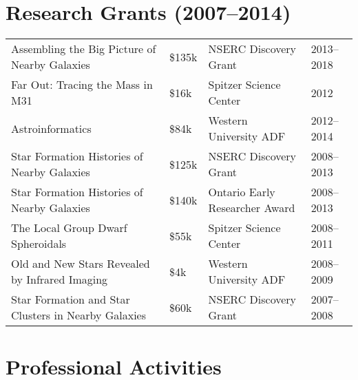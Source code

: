\documentclass[12pt]{article}
\begin{document}

\section{Research Grants (2007--2014)}

\begin{tabular}{p{9cm}lp{5cm}l}

Assembling the Big Picture of Nearby Galaxies & \$135k & NSERC Discovery Grant & 2013--2018 \\ 

Far Out: Tracing the Mass in M31& \$16k& Spitzer Science Center & 2012\\ 

Astroinformatics & \$84k& Western University ADF& 2012--2014\\ 

 Star Formation Histories of Nearby Galaxies & \$125k& NSERC Discovery Grant & 2008--2013\\ 

Star Formation Histories of Nearby Galaxies & \$140k& Ontario Early Researcher Award& 2008--2013\\ 

 The Local Group Dwarf Spheroidals & \$55k& Spitzer Science Center & 2008--2011\\ 

Old and New Stars Revealed by Infrared Imaging & \$4k& Western University ADF  & 2008--2009\\

Star Formation and Star Clusters in Nearby Galaxies & \$60k& NSERC Discovery Grant&2007--2008\\  %


\end{tabular}

\section{Professional Activities}
\end{document}
